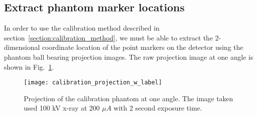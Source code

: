 \subsection{Extract phantom marker locations}
In order to use the calibration method described in section~\ref{section:calibration_method}, we must be able to extract the 2-dimensional coordinate location of the point markers on the detector using the phantom ball bearing projection images.  The raw projection image at one angle is shown in Fig.~\ref{fig:calibration_projection}.

\begin{figure}[ht]
\centering
\texttt{[image: calibration\_projection\_w\_label]}
\caption{Projection of the calibration phantom at one angle.  The image taken used 100 kV x-ray at 200 $\mu A$ with 2 second exposure time.}
\label{fig:calibration_projection}
\end{figure}

